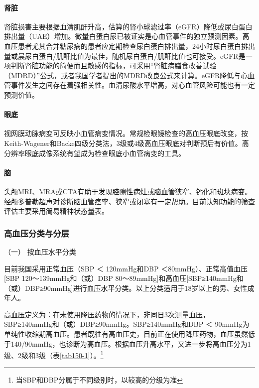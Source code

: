 \paragraph{肾脏}

肾脏损害主要根据血清肌酐升高，估算的肾小球滤过率（eGFR）降低或尿白蛋白排出量（UAE）增加。微量白蛋白尿已被证实是心血管事件的独立预测因素。高血压患者尤其合并糖尿病的患者应定期检查尿白蛋白排出量，24小时尿白蛋白排出量或晨尿白蛋白/肌酐比值为最佳，随机尿白蛋白/肌酐比值也可接受。eGFR是一项判断肾脏功能的简便而且敏感的指标，可采用“肾脏病膳食改善试验（MDRD）”公式，或者我国学者提出的MDRD改良公式来计算。eGFR降低与心血管事件发生之间存在着强相关性。血清尿酸水平增高，对心血管风险可能也有一定预测价值。

\paragraph{眼底}

视网膜动脉病变可反映小血管病变情况。常规检眼镜检查的高血压眼底改变，按Keith-Wagener和Backe四级分类法，3级或4级高血压眼底对判断预后有价值。高分辨率眼底成像系统有望成为检查眼底小血管病变的工具。

\paragraph{脑}

头颅MRI、MRA或CTA有助于发现腔隙性病灶或脑血管狭窄、钙化和斑块病变。经颅多普勒超声对诊断脑血管痉挛、狭窄或闭塞有一定帮助。目前认知功能的筛查评估主要采用简易精神状态量表。

\subsubsection{高血压分类与分层}

\hypertarget{text00409.htmlux5cux23CHP17-3-1-4-1}{}
（一） 按血压水平分类

目前我国采用正常血压（SBP ＜ 120mmHg和DBP ＜80mmHg）、正常高值血压{[}SBP
120～139mmHg和（或）DBP
80～89mmHg{]}和高血压{[}SBP≥140mmHg和（或）DBP≥90mmHg{]}进行血压水平分类。以上分类适用于18岁以上的男、女性成年人。

高血压定义为：在未使用降压药物的情况下，非同日3次测量血压，SBP≥140mmHg和（或）DBP≥90mmHg。SBP≥140mmHg和DBP
＜
90mmHg为单纯性收缩期高血压。患者既往有高血压史，目前正在使用降压药物，血压虽然低于140/90mmHg，也诊断为高血压。根据血压升高水平，又进一步将高血压分为1级、2级和3级（表\ref{tab150-1}）。\footnote{当SBP和DBP分属于不同级别时，以较高的分级为准}

